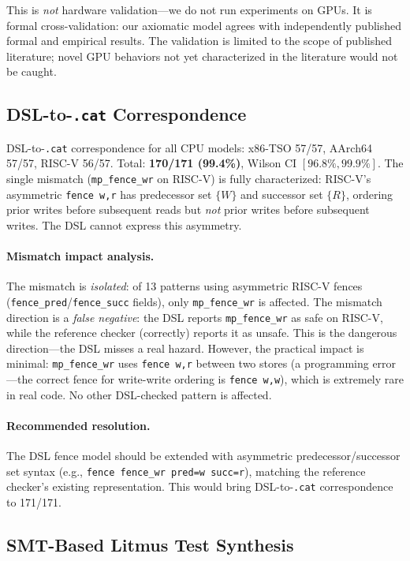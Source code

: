 \documentclass[11pt]{article}
\begin{document}
This is \emph{not} hardware validation---we do not run experiments on
GPUs. It is formal cross-validation: our axiomatic model agrees with
independently published formal and empirical results. The validation
is limited to the scope of published literature; novel GPU behaviors
not yet characterized in the literature would not be caught.

\subsection{DSL-to-\texttt{.cat} Correspondence}
\label{sec:dsl-cat}

DSL-to-\texttt{.cat} correspondence for all CPU models:
x86-TSO 57/57, AArch64 57/57, RISC-V 56/57.
Total: \textbf{170/171 (99.4\%)}, Wilson CI $[96.8\%, 99.9\%]$.
The single mismatch (\texttt{mp\_fence\_wr} on RISC-V) is fully
characterized: RISC-V's asymmetric \texttt{fence w,r} has predecessor
set $\{W\}$ and successor set $\{R\}$, ordering prior writes before
subsequent reads but \emph{not} prior writes before subsequent writes.
The DSL cannot express this asymmetry.

\paragraph{Mismatch impact analysis.}
The mismatch is \emph{isolated}: of 13 patterns using asymmetric
RISC-V fences (\texttt{fence\_pred}/\texttt{fence\_succ} fields),
only \texttt{mp\_fence\_wr} is affected.
The mismatch direction is a \emph{false negative}: the DSL reports
\texttt{mp\_fence\_wr} as safe on RISC-V, while the reference checker
(correctly) reports it as unsafe.
This is the dangerous direction---the DSL misses a real hazard.
However, the practical impact is minimal: \texttt{mp\_fence\_wr} uses
\texttt{fence w,r} between two stores (a programming error---the
correct fence for write-write ordering is \texttt{fence w,w}),
which is extremely rare in real code.
No other DSL-checked pattern is affected.

\paragraph{Recommended resolution.}
The DSL fence model should be extended with asymmetric
predecessor/successor set syntax (e.g.,
\texttt{fence fence\_wr pred=w succ=r}), matching the reference
checker's existing representation.
This would bring DSL-to-\texttt{.cat} correspondence to 171/171.

\subsection{SMT-Based Litmus Test Synthesis}
\label{sec:synthesis}
\end{document}
